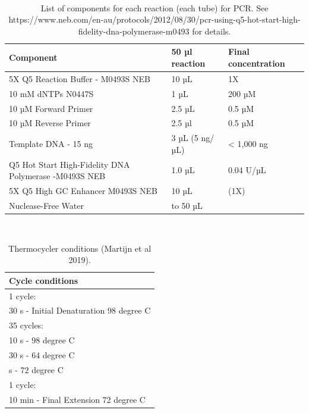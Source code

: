 \documentclass[
]{book}
\begin{document}
~
~

\begin{table}

\caption{\label{tab:table}List of components for each reaction (each tube) for PCR. See https://www.neb.com/en-au/protocols/2012/08/30/pcr-using-q5-hot-start-high-fidelity-dna-polymerase-m0493 for details.  }
\centering
\begin{tabular}[t]{lll}
\toprule
Component & 50 µl reaction & Final concentration\\
\midrule
5X Q5 Reaction Buffer - M0493S NEB & 10 µL & 1X\\
10 mM dNTPs N0447S & 1 µL & 200 µM\\
10 µM Forward Primer & 2.5 µL & 0.5 µM\\
10 µM Reverse Primer & 2.5 µl & 0.5 µM\\
Template DNA - 15 ng & 3 µL (5 ng/µL) & < 1,000 ng\\
\addlinespace
Q5 Hot Start High-Fidelity DNA Polymerase -M0493S NEB & 1.0 µL & 0.04 U/µL\\
5X Q5 High GC Enhancer M0493S NEB & 10 µL & (1X)\\
Nuclease-Free Water & to 50 µL & \\
\bottomrule
\end{tabular}
\end{table}

~

\begin{table}

\caption{\label{tab:table2}Thermocycler conditions (Martijn et al 2019).}
\centering
\begin{tabular}[t]{l}
\toprule
Cycle conditions\\
\midrule
1 cycle:\\
30 s - Initial Denaturation 98 degree C\\
35 cycles:\\
10 s - 98 degree C\\
30 s -  64 degree C\\
\addlinespace
210 s - 72 degree C\\
1 cycle:\\
10 min - Final Extension  72 degree C\\
\bottomrule
\end{tabular}
\end{table}

  
\end{document}
